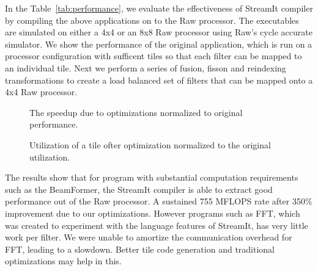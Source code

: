 In the Table~\ref{tab:performance}, we evaluate the effectiveness of
StreamIt compiler by compiling the above applications on to the Raw
processor. The executables are simulated on either a 4x4 or an 8x8 Raw
processor using Raw's cycle accurate simulator. We show the
performance of the original application, which is run on a processor
configuration with sufficent tiles so that each filter can be mapped
to an individual tile. Next we perform a series of fusion, fisson and
reindexing transformations to create a load balanced set of filters
that can be mapped onto a 4x4 Raw processor.

\begin{figure}
\begin{minipage}{3.2in}
\centering
{}
\caption{The speedup due to optimizations normalized to original performance.
\protect\label{fig:opt-diagram}}
\end{minipage}
\hspace{0.1in}
\begin{minipage}{3.2in}
\centering
{}
\caption{Utilization of a tile ofter optimization normalized to the original utilization.}
\end{minipage}
\end{figure}

The results show that for program with substantial computation
requirements such as the BeamFormer, the StreamIt compiler is able to
extract good performance out of the Raw processor. A
sustained 755 MFLOPS rate after 350\% improvement due to our
optimizations. However programs such as FFT, which was created to
experiment with the language features of StreamIt, has very little
work per filter. We were unable to amortize the communication
overhead for FFT, leading to a slowdown. Better tile code generation
and traditional optimizations may help in this. 

